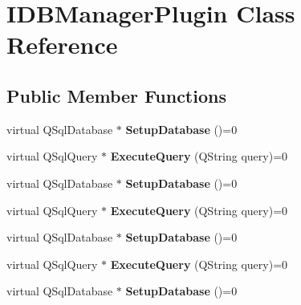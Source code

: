 \hypertarget{class_i_d_b_manager_plugin}{}\section{I\+D\+B\+Manager\+Plugin Class Reference}
\label{class_i_d_b_manager_plugin}
\subsection*{Public Member Functions}
\begin{DoxyCompactItemize}
\item 
virtual Q\+Sql\+Database $\ast$ {\bfseries Setup\+Database} ()=0\hypertarget{class_i_d_b_manager_plugin_add096dcc73790ff4230a44816090d989}{}\label{class_i_d_b_manager_plugin_add096dcc73790ff4230a44816090d989}

\item 
virtual Q\+Sql\+Query $\ast$ {\bfseries Execute\+Query} (Q\+String query)=0\hypertarget{class_i_d_b_manager_plugin_acc0927a1751a2f1d0d87b9b324db17e7}{}\label{class_i_d_b_manager_plugin_acc0927a1751a2f1d0d87b9b324db17e7}

\item 
virtual Q\+Sql\+Database $\ast$ {\bfseries Setup\+Database} ()=0\hypertarget{class_i_d_b_manager_plugin_add096dcc73790ff4230a44816090d989}{}\label{class_i_d_b_manager_plugin_add096dcc73790ff4230a44816090d989}

\item 
virtual Q\+Sql\+Query $\ast$ {\bfseries Execute\+Query} (Q\+String query)=0\hypertarget{class_i_d_b_manager_plugin_acc0927a1751a2f1d0d87b9b324db17e7}{}\label{class_i_d_b_manager_plugin_acc0927a1751a2f1d0d87b9b324db17e7}

\item 
virtual Q\+Sql\+Database $\ast$ {\bfseries Setup\+Database} ()=0\hypertarget{class_i_d_b_manager_plugin_add096dcc73790ff4230a44816090d989}{}\label{class_i_d_b_manager_plugin_add096dcc73790ff4230a44816090d989}

\item 
virtual Q\+Sql\+Query $\ast$ {\bfseries Execute\+Query} (Q\+String query)=0\hypertarget{class_i_d_b_manager_plugin_acc0927a1751a2f1d0d87b9b324db17e7}{}\label{class_i_d_b_manager_plugin_acc0927a1751a2f1d0d87b9b324db17e7}

\item 
virtual Q\+Sql\+Database $\ast$ {\bfseries Setup\+Database} ()=0\hypertarget{class_i_d_b_manager_plugin_add096dcc73790ff4230a44816090d989}{}\label{class_i_d_b_manager_plugin_add096dcc73790ff4230a44816090d989}


\end{DoxyCompactItemize}
